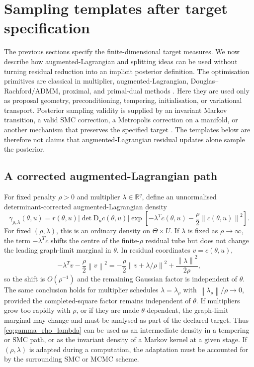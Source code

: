 \documentclass[11pt]{article}
\newcommand{\R}{\mathbb{R}}
\newcommand{\D}{\mathrm{D}}
\newcommand{\abs}[1]{\left\lvert #1\right\rvert}
\newcommand{\norm}[1]{\left\lVert #1\right\rVert}
\begin{document}
\section{Sampling templates after target specification}
\label{sec:algorithms}

The previous sections specify the finite-dimensional target measures. We now describe how augmented-Lagrangian and splitting ideas can be used without turning residual reduction into an implicit posterior definition. The optimisation primitives are classical in multiplier, augmented-Lagrangian, Douglas--Rachford/ADMM, proximal, and primal-dual methods \cite{Hestenes1969,Rockafellar1974,EcksteinBertsekas1992,BoydParikhChuPeleatoEckstein2011,ParikhBoyd2014,ChambollePock2011}. Here they are used only as proposal geometry, preconditioning, tempering, initialisation, or variational transport. Posterior sampling validity is supplied by an invariant Markov transition, a valid SMC correction, a Metropolis correction on a manifold, or another mechanism that preserves the specified target \cite{Neal2001,Chopin2002,DelMoralDoucetJasra2006, BeskosJasraMuzafferStuart2015}. The templates below are therefore not claims that augmented-Lagrangian residual updates alone sample the posterior.

\subsection{A corrected augmented-Lagrangian path}

For fixed penalty \(\rho>0\) and multiplier \(\lambda\in\R^q\), define an
unnormalised determinant-corrected augmented-Lagrangian density
\begin{equation}
 \gamma_{\rho,\lambda}(\theta,u)
 =
 r(\theta,u)
 \abs{\det\D_u c(\theta,u)}
 \exp\!\left[-\lambda^T c(\theta,u)-\frac{\rho}{2}\norm{c(\theta,u)}^2\right].
 \label{eq:gamma_rho_lambda}
\end{equation}
For fixed \((\rho,\lambda)\), this is an ordinary density on \(\Theta\times U\). If \(\lambda\) is fixed as \(\rho\to\infty\), the term \(-\lambda^Tc\) shifts the centre of the finite-\(\rho\) residual tube but does not change the leading graph-limit marginal in \(\theta\). In residual coordinates \(v=c(\theta,u)\),
\[ -\lambda^Tv-\frac{\rho}{2}\norm{v}^2
 =
 -\frac{\rho}{2}\norm{v+\lambda/\rho}^2
 +\frac{\norm{\lambda}^2}{2\rho},\]
so the shift is \(O(\rho^{-1})\) and the remaining Gaussian factor is
independent of \(\theta\). The same conclusion holds for multiplier schedules
\(\lambda=\lambda_\rho\) with \(\norm{\lambda_\rho}/\rho\to0\), provided the
completed-square factor remains independent of \(\theta\). If multipliers grow
too rapidly with \(\rho\), or if they are made \(\theta\)-dependent, the
graph-limit marginal may change and must be analysed as part of the declared
target. Thus \eqref{eq:gamma_rho_lambda} can be used as an intermediate density
in a tempering or SMC path, or as the invariant density of a Markov kernel at a
given stage. If \((\rho,\lambda)\) is adapted during a computation, the
adaptation must be accounted for by the surrounding SMC or MCMC scheme.
\end{document}
